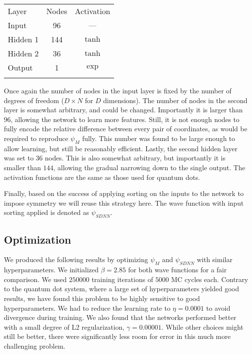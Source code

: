 \documentclass[Thesis.tex]{subfiles}
\begin{document}
\begin{center}
  \begin{tabular}{lcc}
    \toprule
    \addlinespace
    Layer & Nodes & Activation\\
    \addlinespace
    \midrule
    \addlinespace
    \addlinespace
    Input & 96 & ---\\
    Hidden 1& 144 & $\tanh$\\
    Hidden 2& 36 & $\tanh$\\
    Output & 1 & $\exp$\\
    \addlinespace
    \addlinespace
    \bottomrule
  \end{tabular}
\end{center}
Once again the number of nodes in the input layer is fixed by the number of
degrees of freedom ($D\times N$ for $D$ dimensions). The number of nodes in the
second layer is somewhat arbitrary, and could be changed. Importantly it is
larger than $96$, allowing the network to learn more features. Still, it is not
enough nodes to fully encode the relative difference between every pair of
coordinates, as would be required to reproduce $\psi_M$ fully. This number was
found to be large enough to allow learning, but still be reasonably efficient.
Lastly, the second hidden layer was set to $36$ nodes. This is also somewhat
arbitrary, but importantly it is smaller than $144$, allowing the gradual
narrowing down to the single output. The activation functions are the same as
those used for quantum dots.

Finally, based on the success of applying sorting on the inputs to the network
to impose symmetry we will reuse this strategy here. The wave function with
input sorting applied is denoted as $\psi_{SDNN}$.

\subsection{Optimization}

We produced the following results by optimizing $\psi_M$ and $\psi_{SDNN}$ with
similar hyperparameters. We initialized $\beta=\num{2.85}$ for both wave functions
for a fair comparison. We used $\num{250000}$ training iterations of
$\num{5000}$ MC cycles each. Contrary to the quantum dot system, where a large
set of hyperparameters yielded good results, we have found this problem to be
highly sensitive to good hyperparameters. We had to reduce the learning rate to
$\eta=\num{0.0001}$ to avoid divergence during training. We also found that the
networks performed better with a small degree of L2 regularization,
$\gamma=\num{0.00001}$. While other choices might still be better, there were
significantly less room for error in this much more challenging problem.
\end{document}
